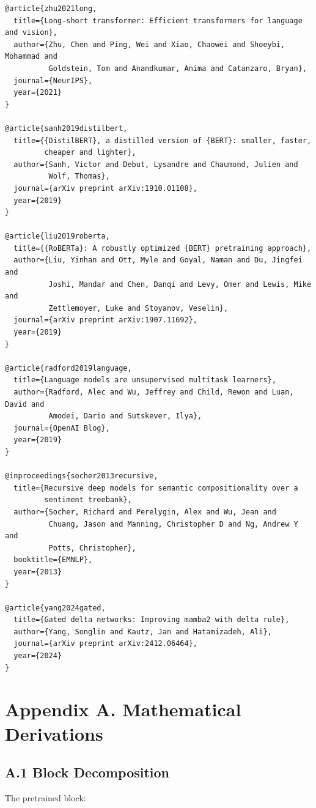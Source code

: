 \begin{lstlisting}
@article{zhu2021long,
  title={Long-short transformer: Efficient transformers for language and vision},
  author={Zhu, Chen and Ping, Wei and Xiao, Chaowei and Shoeybi, Mohammad and 
          Goldstein, Tom and Anandkumar, Anima and Catanzaro, Bryan},
  journal={NeurIPS},
  year={2021}
}

@article{sanh2019distilbert,
  title={{DistilBERT}, a distilled version of {BERT}: smaller, faster, 
         cheaper and lighter},
  author={Sanh, Victor and Debut, Lysandre and Chaumond, Julien and 
          Wolf, Thomas},
  journal={arXiv preprint arXiv:1910.01108},
  year={2019}
}

@article{liu2019roberta,
  title={{RoBERTa}: A robustly optimized {BERT} pretraining approach},
  author={Liu, Yinhan and Ott, Myle and Goyal, Naman and Du, Jingfei and 
          Joshi, Mandar and Chen, Danqi and Levy, Omer and Lewis, Mike and 
          Zettlemoyer, Luke and Stoyanov, Veselin},
  journal={arXiv preprint arXiv:1907.11692},
  year={2019}
}

@article{radford2019language,
  title={Language models are unsupervised multitask learners},
  author={Radford, Alec and Wu, Jeffrey and Child, Rewon and Luan, David and 
          Amodei, Dario and Sutskever, Ilya},
  journal={OpenAI Blog},
  year={2019}
}

@inproceedings{socher2013recursive,
  title={Recursive deep models for semantic compositionality over a 
         sentiment treebank},
  author={Socher, Richard and Perelygin, Alex and Wu, Jean and 
          Chuang, Jason and Manning, Christopher D and Ng, Andrew Y and 
          Potts, Christopher},
  booktitle={EMNLP},
  year={2013}
}

@article{yang2024gated,
  title={Gated delta networks: Improving mamba2 with delta rule},
  author={Yang, Songlin and Kautz, Jan and Hatamizadeh, Ali},
  journal={arXiv preprint arXiv:2412.06464},
  year={2024}
}
\end{lstlisting}




\section{Appendix A. Mathematical Derivations}

\subsection{A.1 Block Decomposition}

The pretrained block:

